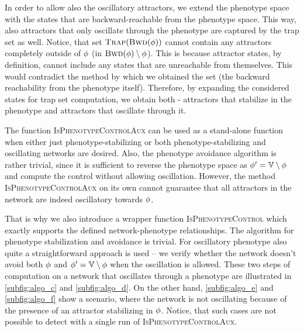   In order to allow also the oscillatory attractors, we extend the phenotype space with the states that are backward-reachable from the phenotype space. This way, also attractors that only oscillate through the phenotype are captured by the trap set as well. Notice, that set $\textsc{Trap}(\textsc{Bwd}(\phi))$ cannot contain any attractors completely outside of $\phi$ (in $\textsc{Bwd}(\phi) \setminus \phi$). This is because attractor states, by definition, cannot include any states that are unreachable from themselves. This would contradict the method by which we obtained the set (the backward reachability from the phenotype itself). Therefore, by expanding the considered states for trap set computation, we obtain both - attractors that stabilize in the phenotype and attractors that oscillate through it.
  
  The function \textsc{IsPhenotypeControlAux} can be used as a stand-alone function when either just phenotype-stabilizing or both phenotype-stabilizing and oscillating networks are desired. Also, the phenotype avoidance algorithm is rather trivial, since it is sufficient to reverse the phenotype space as $\phi'= \mathbb{V} \setminus \phi$ and compute the control without allowing oscillation. However, the method \textsc{IsPhenotypeControlAux} on its own cannot guarantee that all attractors in the network are indeed oscillatory towards $\phi$.
  
  That is why we also introduce a wrapper function \textsc{IsPhenotypeControl} which exactly supports the defined network-phenotype relationships. The algorithm for phenotype stabilization and avoidance is trivial. For oscillatory phenotype also quite a straightforward approach is used -- we verify whether the network doesn't avoid both $\phi$ and $\phi'= \mathbb{V} \setminus \phi$ when the oscillation is allowed. These two steps of computation on a network that oscillates through a phenotype are illustrated in \autoref{subfig:algo_c} and \autoref{subfig:algo_d}. On the other hand, \autoref{subfig:algo_e} and \autoref{subfig:algo_f} show a scenario, where the network is not oscillating because of the presence of an attractor stabilizing in $\phi$. Notice, that such cases are not possible to detect with a single run of \textsc{IsPhenotypeControlAux}.

  

